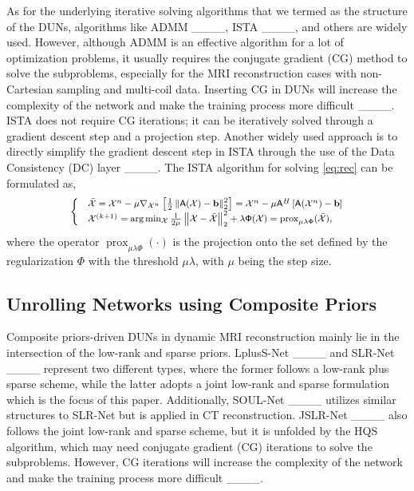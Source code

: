 As for the underlying iterative solving algorithms that we termed as the structure of the DUNs, algorithms like ADMM ____, ISTA ____, and others are widely used. However, although ADMM is an effective algorithm for a lot of optimization problems, it usually requires the conjugate gradient (CG) method to solve the subproblems, especially for the MRI reconstruction cases with non-Cartesian sampling and multi-coil data. Inserting CG in DUNs will increase the complexity of the network and make the training process more difficult ____. ISTA does not require CG iterations; it can be iteratively solved through a gradient descent step and a projection step. Another widely used approach is to directly simplify the gradient descent step in ISTA through the use of the Data Consistency (DC) layer ____. %
The ISTA algorithm for solving \eqref{eq:rec} can be formulated as,
\begin{equation}
	\footnotesize
	\label{eq:ista}
	\begin{cases}
		&\bar{\mathcal{X}} = \mathcal{X}^{n} - \mu \nabla_{\mathcal{X}^{n}} \left[ \frac{1}{2} \left\| \mathsf{A} (\mathcal{X}) - \mathbf{b} \right\|_2^2 \right] = \mathcal{X}^{n} - \mu \mathsf{A}^H\left[\mathsf{A}(\mathcal{X}^{n})-\mathbf{b}\right] \\
		&\mathcal{X}^{(k+1)} = \arg\min_{\mathcal{X}} \frac{1}{2\mu} \left\| \mathcal{X} - \bar{\mathcal{X}} \right\|_2^2 + \lambda \mathsf{\Phi}(\mathcal{X})=\operatorname{prox}_{\mu\lambda \mathsf{\Phi}}(\bar{\mathcal{X}}),
	\end{cases}
\end{equation}
where the operator $\operatorname{prox}_{\mu\lambda \mathsf{\Phi}}(\cdot)$ is the projection onto the set defined by the regularization $\Phi$ with the threshold $\mu\lambda$, with $\mu$ being the step size.

\subsection{Unrolling Networks using Composite Priors}
Composite priors-driven DUNs in dynamic MRI reconstruction mainly lie in the intersection of the low-rank and sparse priors. LplusS-Net ____ and SLR-Net ____ represent two different types, where the former follows a low-rank plus sparse scheme, while the latter adopts a joint low-rank and sparse formulation which is the focus of this paper. Additionally, SOUL-Net ____ utilizes similar structures to SLR-Net but is applied in CT reconstruction. JSLR-Net ____ also follows the joint low-rank and sparse scheme, but it is unfolded by the HQS algorithm, which may need conjugate gradient (CG) iterations to solve the subproblems. However, CG iterations will increase the complexity of the network and make the training process more difficult ____.

